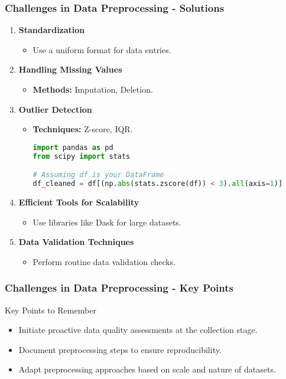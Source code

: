 \documentclass[aspectratio=169]{beamer}
\begin{document}
\begin{frame}[fragile]
    \frametitle{Challenges in Data Preprocessing - Solutions}
    \begin{enumerate}
        \item \textbf{Standardization}
            \begin{itemize}
                \item Use a uniform format for data entries.
            \end{itemize}
        \item \textbf{Handling Missing Values}
            \begin{itemize}
                \item \textbf{Methods:} Imputation, Deletion.
            \end{itemize}
        \item \textbf{Outlier Detection}
            \begin{itemize}
                \item \textbf{Techniques:} Z-score, IQR.
                \begin{lstlisting}[language=Python]
import pandas as pd
from scipy import stats

# Assuming df is your DataFrame
df_cleaned = df[(np.abs(stats.zscore(df)) < 3).all(axis=1)]
                \end{lstlisting}
            \end{itemize}
        \item \textbf{Efficient Tools for Scalability}
            \begin{itemize}
                \item Use libraries like Dask for large datasets.
            \end{itemize}
        \item \textbf{Data Validation Techniques}
            \begin{itemize}
                \item Perform routine data validation checks.
            \end{itemize}
    \end{enumerate}
\end{frame}

\begin{frame}[fragile]
    \frametitle{Challenges in Data Preprocessing - Key Points}
    \begin{block}{Key Points to Remember}
        \begin{itemize}
            \item Initiate proactive data quality assessments at the collection stage.
            \item Document preprocessing steps to ensure reproducibility.
            \item Adapt preprocessing approaches based on scale and nature of datasets.
        \end{itemize}
    \end{block}
\end{frame}
\end{document}
